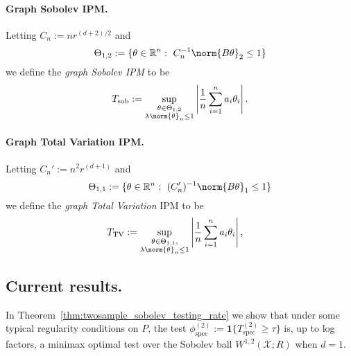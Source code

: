 \documentclass{article}
\newcommand{\Reals}{\mathbb{R}}
\newcommand{\abs}[1]{\left \lvert #1 \right \rvert}
\newcommand{\1}{\mathbf{1}}
\theoremstyle{alden}
\theoremstyle{aldenthm}
\theoremstyle{definition}
\theoremstyle{remark}
\begin{document}
\paragraph{Graph Sobolev IPM.}
Letting $C_n := nr^{(d + 2)/2}$ and
\begin{equation*}
\Theta_{1,2} := \{\theta \in \Reals^n:~ C_n^{-1} \norm{B\theta}_2 \leq 1\} 
\end{equation*}
we define the \emph{graph Sobolev IPM} to be
\begin{equation}
\label{eqn:sobolev_IPM}
T_{\textrm{sob}} := \sup_{\substack{\theta \in \Theta_{1,2} \\ \lambda \norm{\theta}_n \leq 1}} \abs{\frac{1}{n}\sum_{i = 1}^{n} a_i \theta_i}. 
\end{equation}

\paragraph{Graph Total Variation IPM.}
Letting $C_n' := n^{2}r^{(d + 1)}$ and 
\begin{equation*}
\Theta_{1,1} := \{\theta \in \Reals^n:~ (C_n')^{-1} \norm{B\theta}_1 \leq 1\}
\end{equation*}
we define the \emph{graph Total Variation} IPM to be
\begin{equation}
\label{eqn:total_variation_IPM}
T_{\mathrm{TV}} := \sup_{\substack{\theta \in \Theta_{1,1}, \\ \lambda \norm{\theta}_n \leq 1} } \abs{\frac{1}{n}\sum_{i = 1}^{n} a_i \theta_i}, \quad
\end{equation}

\subsection{Current results.}

In Theorem~\ref{thm:twosample_sobolev_testing_rate} we show that under some typical regularity conditions on $P$, the test $\phi_{\textrm{spec}}^{(2)} := \1\{T_{\mathrm{spec}}^{(2)} \geq \tau\}$ is, up to log factors, a minimax optimal test over the Sobolev ball $W^{1,2}(\mathcal{X};R)$ when $d = 1$.
\end{document}
